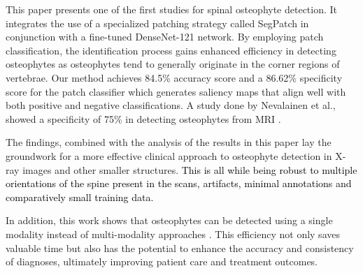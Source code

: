 \documentclass{article}
\newcommand{\soumya}[1]{\textcolor{red}{#1}}
\newcommand{\update}[1]{\textcolor{black}{#1}}
\newcommand{\final}[1]{\textcolor{black}{#1}}
\begin{document}

This paper presents one of the first studies for spinal osteophyte detection. It integrates the use of a specialized patching strategy called SegPatch in conjunction with a fine-tuned DenseNet-121 network. By employing patch classification, the identification process gains enhanced efficiency in detecting osteophytes as osteophytes tend to generally originate in the corner regions of vertebrae. Our method achieves 84.5\% accuracy score and a 86.62\% specificity score for the patch classifier which generates saliency maps that align well with both positive and negative classifications. A study done by Nevalainen et al., showed a specificity of 75\% in detecting osteophytes from MRI \cite{nevalainen2023ultrasound}. 

The findings, combined with the analysis of the results in this paper lay the groundwork for a more effective clinical approach to osteophyte detection in X-ray images and other smaller structures. 
\final{This is all while being robust to multiple orientations of the spine present in the scans, artifacts, minimal annotations and comparatively small training data.}

In addition, this work shows that osteophytes can be detected using a single modality instead of multi-modality approaches \cite{wang2016detection}.
This efficiency not only saves valuable time but also has the potential to enhance the accuracy and consistency of diagnoses, ultimately improving patient care and treatment outcomes.
\end{document}
